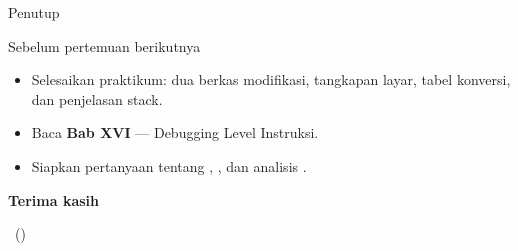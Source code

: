 \documentclass[aspectratio=169,11pt]{beamer}
\begin{document}
\begin{frame}{Penutup}
\begin{block}{Sebelum pertemuan berikutnya}
\small
\begin{itemize}
    \item Selesaikan praktikum: dua berkas  modifikasi,
          tangkapan layar, tabel konversi, dan penjelasan stack.
    \item Baca \textbf{Bab XVI} — Debugging Level Instruksi.
    \item Siapkan pertanyaan tentang , , dan
          analisis .
\end{itemize}
\end{block}

\vspace{0.4em}
\begin{center}
{\color{obeBlue}\sffamily\large\bfseries Terima kasih\par}
\vspace{0.15em}
{\color{obeGray}\sffamily\small \NamaMK\ (\KodeMK)
\textbullet\ \SemesterTeks\par}
\end{center}
\end{frame}
\end{document}
